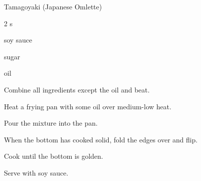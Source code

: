 \begin{recipe}{Tamagoyaki (Japanese Omlette)}{}{}

\begin{description}
\item 2 s
\item {} soy sauce
\item {} sugar
\item oil
\end{description}

\begin{directions}
\item Combine all ingredients except the oil and beat.
\item Heat a frying pan with some oil over medium-low heat.
\item Pour the mixture into the pan.
\item When the bottom has cooked solid, fold the edges over and flip.
\item Cook until the bottom is golden.
\item Serve with soy sauce.
\end{directions}

\end{recipe}
